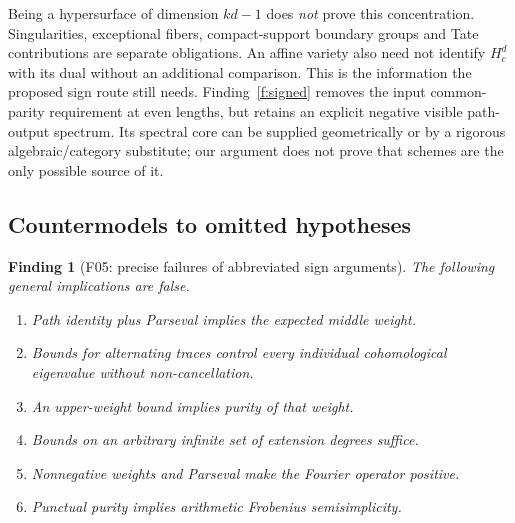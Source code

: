 \documentclass[11pt,a4paper]{article}
\newcommand{\fid}[1]{\textsf{#1}}\newcommand{\gate}[1]{\textsf{#1}}
\theoremstyle{named}\newtheorem{finding}{Finding}[section]
\theoremstyle{definition}\newtheorem{definition}[finding]{Definition}
\theoremstyle{remark}\newtheorem{remark}[finding]{Remark}
\begin{document}
Being a hypersurface of dimension $kd-1$ does \emph{not} prove this concentration. Singularities, exceptional fibers, compact-support boundary groups and Tate contributions are separate obligations. An affine variety also need not identify $H_c^d$ with its dual without an additional comparison. This is the information the proposed sign route still needs. Finding~\ref{f:signed} removes the input common-parity requirement at even lengths, but retains an explicit negative visible path-output spectrum. Its spectral core can be supplied geometrically or by a rigorous algebraic/category substitute; our argument does not prove that schemes are the only possible source of it.

\subsection{Countermodels to omitted hypotheses}
\begin{finding}[\fid{F05}: precise failures of abbreviated sign arguments]\label{f:countermodels}
The following general implications are false.
\begin{enumerate}[label=(\alph*)]
\item Path identity plus Parseval implies the expected middle weight.
\item Bounds for alternating traces control every individual cohomological eigenvalue without non-cancellation.
\item An upper-weight bound implies purity of that weight.
\item Bounds on an arbitrary infinite set of extension degrees suffice.
\item Nonnegative weights and Parseval make the Fourier operator positive.
\item Punctual purity implies arithmetic Frobenius semisimplicity.
\end{enumerate}
\end{finding}
\end{document}
